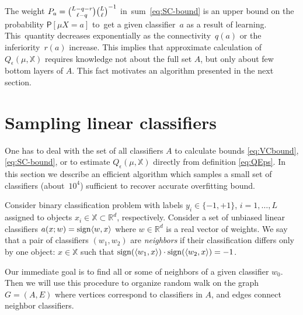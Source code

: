 \documentclass{article} %
\def\XX{\mathbb{X}}
\def\RR{\mathbb{R}}
\def\CC_#1^#2{\tbinom{#1}{#2}}
\def\eps{\epsilon}
\newcommand{\sign}{\mathop{\rm sign}\limits}
\providecommand{\Prob}{\mathsf{P}}
\begin{document}
The weight
$P_a = {\CC_{L-q-r}^{\ell-q}} {\CC_{L}^{\ell}}^{-1}$
in~sum~\eqref{eq:SC-bound}
is an upper bound on the probability
$\Prob[\mu X= a]$
to~get a given classifier~$a$ as a result of learning.
This~quantity decreases exponentially as the connectivity~$q(a)$ or the inferiority~$r(a)$ increase.
This implies that approximate calculation of $Q_\eps(\mu, \XX)$ requires knowledge not about the full set $A$,
but only about few bottom layers of $A$.
This fact motivates an algorithm presented in the next section.

\section{Sampling linear classifiers}
One has to deal with the set of all classifiers $A$
to calculate bounds \eqref{eq:VCbound}, \eqref{eq:SC-bound},
or to estimate $Q_\eps (\mu, \XX)$ directly from definition \eqref{eq:QEps}.
In this section we describe an efficient algorithm which samples a small set of classifiers (about~$10^4$)
sufficient to recover accurate overfitting bound.

Consider binary classification problem with labels $y_i \in \{-1, +1\}$,
$i = 1,\dots,L$ assigned to objects $x_i \in \XX \subset \RR^d$, respectively.
Consider a set of unbiased linear classifiers $a(x; w) = \sign \langle w, x \rangle$
where $w \in \RR^d$ is a real vector of weights.
We say that a pair of classifiers $(w_1, w_2)$ are \emph{neighbors}
if their classification differs only by one object: $x \in \XX$
such that
$\sign(\langle w_1, x \rangle) \cdot \sign(\langle w_2, x \rangle) = -1$.

Our immediate goal is to find all or some of neighbors of a given classifier $w_0$.
Then we will use this procedure to organize random walk on the graph $G = (A, E)$
where vertices correspond to classifiers in $A$, and edges connect neighbor classifiers.
\end{document}
